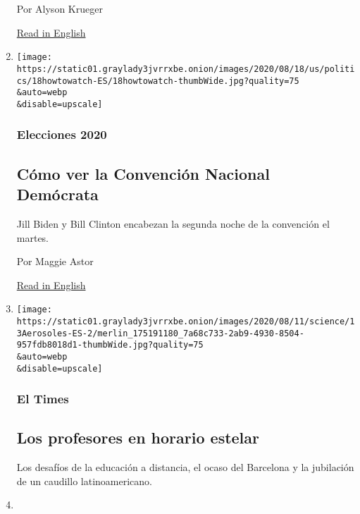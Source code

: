\begin{enumerate}
  Por Alyson Krueger

  \href{https://www.nytimes3xbfgragh.onion/2020/08/16/style/does-rapid-covid-testing-work-weddings-parties.html}{Read
  in English}
\item
  \href{/es/2020/08/18/espanol/estados-unidos/horario-cnd-convencion-democrata.html}{}

  \texttt{[image: https://static01.graylady3jvrrxbe.onion/images/2020/08/18/us/politics/18howtowatch-ES/18howtowatch-thumbWide.jpg?quality=75\\\&auto=webp\\\&disable=upscale]}

  \hypertarget{elecciones-2020-5}{%
  \subsubsection{Elecciones 2020}\label{elecciones-2020-5}}

  \hypertarget{cuxf3mo-ver-la-convenciuxf3n-nacional-demuxf3crata}{%
  \subsection{Cómo ver la Convención Nacional
  Demócrata}\label{cuxf3mo-ver-la-convenciuxf3n-nacional-demuxf3crata}}

  Jill Biden y Bill Clinton encabezan la segunda noche de la convención
  el martes.

  Por Maggie Astor

  \href{https://www.nytimes3xbfgragh.onion/2020/08/18/us/politics/speakers-dnc-schedule.html}{Read
  in English}
\item
  \href{/es/2020/08/18/espanol/aprendo-en-casa-coronavirus.html}{}

  \texttt{[image: https://static01.graylady3jvrrxbe.onion/images/2020/08/11/science/13Aerosoles-ES-2/merlin\_175191180\_7a68c733-2ab9-4930-8504-957fdb8018d1-thumbWide.jpg?quality=75\\\&auto=webp\\\&disable=upscale]}

  \hypertarget{el-times}{%
  \subsubsection{El Times}\label{el-times}}

  \hypertarget{los-profesores-en-horario-estelar}{%
  \subsection{Los profesores en horario
  estelar}\label{los-profesores-en-horario-estelar}}

  Los desafíos de la educación a distancia, el ocaso del Barcelona y la
  jubilación de un caudillo latinoamericano.
\item
  \href{/es/2020/08/17/espanol/america-latina/vacuna-coronavirus-brasil.html}{}


\end{enumerate}

